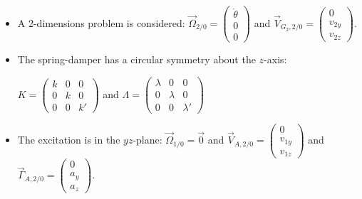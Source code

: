 \documentclass[a4paper, 11pt]{article}
\begin{document}
\begin{itemize}

 \item A 2-dimensions problem is considered: $\overrightarrow{\Omega}_{2/0} =
       \begin{pmatrix}
        \dot{\theta} \\
        0            \\
        0
       \end{pmatrix}$ and $\overrightarrow{V}_{G_2, 2/0} =
       \begin{pmatrix}
        0      \\
        v_{2y} \\
        v_{2z}
       \end{pmatrix}$.

 \item The spring-damper has a circular symmetry about the $z$-axis:

       {\centering
        $K =
        \begin{pmatrix}
         k & 0 & 0  \\
         0 & k & 0  \\
         0 & 0 & k'
        \end{pmatrix}$ and $\Lambda =
        \begin{pmatrix}
         \lambda & 0       & 0        \\
         0       & \lambda & 0        \\
         0       & 0       & \lambda'
        \end{pmatrix}$
        \par}

 \item The excitation is in the $yz$-plane: $\overrightarrow{\Omega}_{1/0} = \overrightarrow{0}$ and $\overrightarrow{V}_{A, 2/0}
       =
       \begin{pmatrix}
        0      \\
        v_{1y} \\
        v_{1z}
       \end{pmatrix}$
       and $\overrightarrow{\Gamma}_{A, 2/0}
       =
       \begin{pmatrix}
        0      \\
        a_y \\
        a_z
       \end{pmatrix}$.


\end{itemize}
\end{document}
